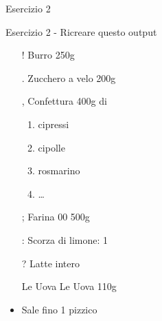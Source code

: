 \begin{frame}{Esercizio 2}

\begin{esercizio}{Esercizio 2 - Ricreare questo output}
 \begin{itemize}
 \item[!] Burro 250g
 \item[.] Zucchero a velo 200g
 \item[,] Confettura 400g di
 \begin{enumerate}
  \item cipressi
  \item cipolle
  \item rosmarino
  \item \dots
 \end{enumerate}

 \item[;] Farina 00 500g
 \item[:] Scorza di limone: 1
 \item[?] Latte intero
 \item[Le Uova] Le Uova 110g
 \item Sale fino 1 pizzico
\end{itemize}
\end{esercizio}

\end{frame}